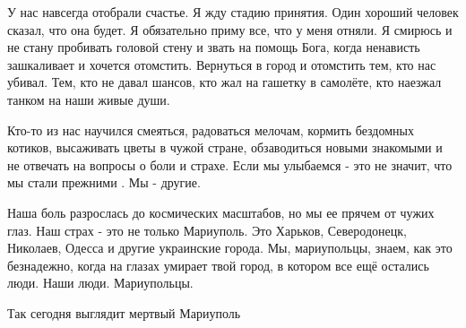 У нас навсегда отобрали счастье. Я жду стадию принятия. Один хороший человек
сказал, что она будет. Я обязательно приму все, что у меня отняли. Я смирюсь и
не стану пробивать головой стену и звать на помощь Бога, когда ненависть
зашкаливает и хочется отомстить. Вернуться в город  и отомстить тем, кто нас
убивал. Тем, кто не давал шансов, кто жал на гашетку в самолёте, кто наезжал
танком на наши  живые души. 

Кто-то  из нас  научился  смеяться, радоваться мелочам, кормить бездомных
котиков, высаживать цветы в чужой стране, обзаводиться новыми  знакомыми и не
отвечать на вопросы о боли и страхе. Если мы улыбаемся - это не значит, что мы
стали прежними . Мы - другие. 

Наша боль разрослась до космических масштабов, но мы ее прячем от чужих глаз.
Наш страх - это не только Мариуполь. Это Харьков, Северодонецк, Николаев,
Одесса и другие украинские города. Мы, мариупольцы, знаем, как это безнадежно,
когда на  глазах умирает твой город, в котором все ещё остались люди. Наши
люди. Мариупольцы. 

Так сегодня выглядит мертвый Мариуполь
